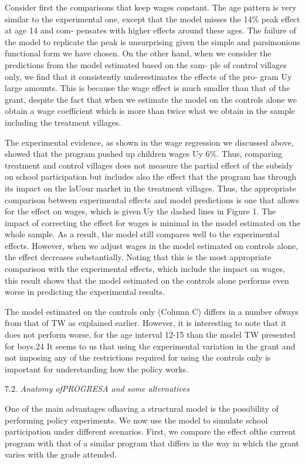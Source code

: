 Consider first the comparisons that keep wages constant. The age pattern is very similar to the experimental one, except that the model misses the 14\% peak effect at age 14 and com- pensates with higher effects around these ages. The failure of the model to replicate the peak is unsurprising given the simple and parsimonious functional form we have chosen. On the other hand, when we consider the predictions from the model estimated based on the sam- ple of control villages only, we find that it consistently underestimates the effects of the pro- gram Uy large amounts. This is because the wage effect is much smaller than that of the grant, despite the fact that when we estimate the model on the controls alone we obtain a wage coefficient which is more than twice what we obtain in the sample including the treatment villages.

The experimental evidence, as shown in the wage regression we discussed above, showed that the program pushed up children wages Uy 6\%. Thus, comparing treatment and control villages does not measure the partial effect of the subsidy on school participation but includes also the effect that the program has through its impact on the laUour market in the treatment villages. Thus, the appropriate comparison between experimental effects and model predictions is one that allows for the effect on wages, which is given Uy the dashed lines in Figure 1. The impact of correcting the effect for wages is minimal in the model estimated on the whole sample. As a result, the model still compares well to the experimental effects. However, when we adjust wages in the model estimated on controls alone, the effect decreases substantially. Noting that this is the most appropriate comparison with the experimental effects, which include the impact on wages, this result shows that the model estimated on the controls alone performs even worse in predicting the experimental results.

The model estimated on the controls only (Column C) differs in a number ofways from that of TW as explained earlier. However, it is interesting to note that it does not perform worse, for the age interval 12-15 than the model TW presented for boys.24 It seems to us that using the experimental variation in the grant and not imposing any of the restrictions required for using the controls only is important for understanding how the policy works.

7.2. {\it Anatomy ofPROGRESA and some alternatives}

One of the main advantages ofhaving a structural model is the possibility of performing policy experiments. We now use the model to simulate school participation under different scenarios. First, we compare the effect ofthe current program with that of a similar program that differs in the way in which the grant varies with the grade attended.


